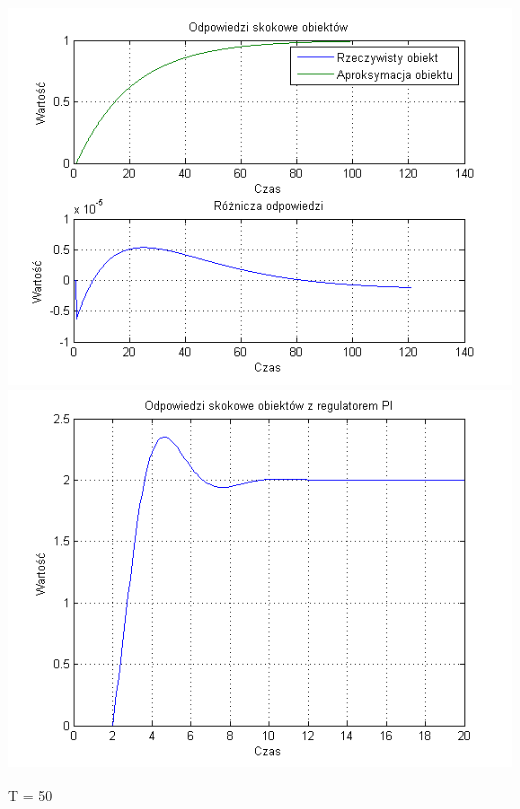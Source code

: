 \documentclass[10pt,a4paper]{article}
\begin{document}
\begin{center}
\includegraphics[scale=1]{images/jeden/skrypt_31.png}\\
\includegraphics[scale=1]{images/jeden/skrypt_32.png}\\
\end{center}
\newpage
T = 50
\end{document}
